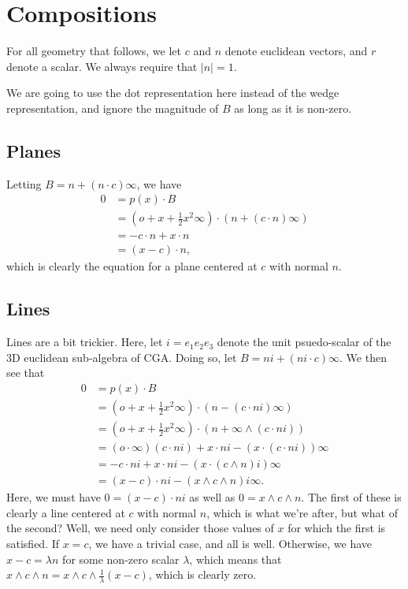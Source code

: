 \documentclass[12pt]{article}
\newcommand{\nvao}{o}
\newcommand{\nvai}{\infty}
\begin{document}
\section*{Compositions}

For all geometry that follows, we let $c$ and $n$ denote euclidean vectors, and $r$ denote a scalar.
We always require that $|n|=1$.

We are going to use the dot representation here instead of the wedge representation,
and ignore the magnitude of $B$ as long as it is non-zero.

\subsection*{Planes}

Letting $B=n + (n\cdot c)\nvai$, we have
\begin{align*}
0 &= p(x)\cdot B \\
 &= \left(\nvao + x + \frac{1}{2}x^2\nvai\right)\cdot(n + (c\cdot n)\nvai) \\
 &= -c\cdot n + x\cdot n \\
 &= (x-c)\cdot n,
\end{align*}
which is clearly the equation for a plane centered at $c$ with normal $n$.

\subsection*{Lines}

Lines are a bit trickier.  Here, let $i=e_1e_2e_3$ denote the unit psuedo-scalar of the 3D euclidean sub-algebra of CGA.
Doing so, let $B=ni + (ni\cdot c)\nvai$.  We then see that
\begin{align*}
0 &= p(x)\cdot B \\
 &= \left(\nvao + x + \frac{1}{2}x^2\nvai\right)\cdot (n - (c\cdot ni)\nvai) \\
 &= \left(\nvao + x + \frac{1}{2}x^2\nvai\right)\cdot (n + \nvai\wedge (c\cdot ni)) \\
 &= (\nvao\cdot\nvai)(c\cdot ni) + x\cdot ni - (x\cdot(c\cdot ni))\nvai \\
 &= -c\cdot ni + x\cdot ni - (x\cdot (c\wedge n)i)\nvai \\
 &= (x - c)\cdot ni - (x\wedge c\wedge n)i\nvai.
\end{align*}
Here, we must have $0=(x-c)\cdot ni$ as well as $0=x\wedge c\wedge n$.
The first of these is clearly a line centered at $c$ with normal $n$, which is what we're after, but what of the second?
Well, we need only consider those values of $x$ for which the first is satisfied.
If $x=c$, we have a trivial case, and all is well.
Otherwise, we have $x-c=\lambda n$ for some non-zero scalar $\lambda$,
which means that $x\wedge c\wedge n=x\wedge c\wedge\frac{1}{\lambda}(x-c)$, which
is clearly zero.
\end{document}
